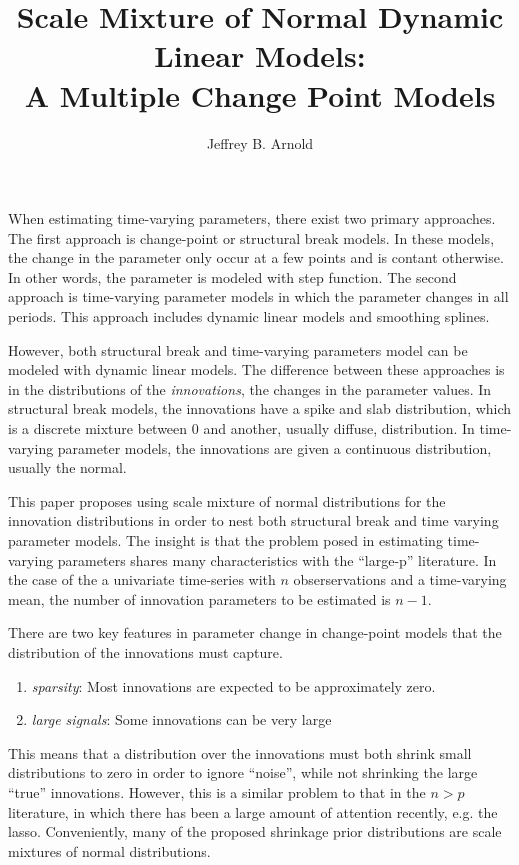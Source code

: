 \documentclass{article}
\author{Jeffrey B. Arnold}
\title{Scale Mixture of Normal Dynamic Linear Models:\\
  A Multiple Change Point Models}
\begin{document}
\maketitle{}

When estimating time-varying parameters, there exist two primary approaches.
The first approach is change-point or structural break models. 
In these models, the change in the parameter only occur at a few points and is contant otherwise.
In other words, the parameter is modeled with step function.
The second approach is time-varying parameter models in which the parameter changes in all periods.
This approach includes dynamic linear models and smoothing splines.

However, both structural break and time-varying parameters model can be modeled with dynamic linear models.
The difference between these approaches is in the distributions of the \textit{innovations}, the changes in the parameter values.
In structural break models, the innovations have a spike and slab distribution, which is a discrete mixture between 0 and another, usually diffuse, distribution.
In time-varying parameter models, the innovations are given a continuous distribution, usually the normal.

This paper proposes using scale mixture of normal distributions for the innovation distributions in order to nest both structural break and time varying parameter models.
The insight is that the problem posed in estimating time-varying parameters shares many characteristics with the ``large-p'' literature.
In the case of the a univariate time-series with $n$ obserservations and a time-varying mean, the number of innovation parameters to be estimated is $n - 1$.

There are two key features in parameter change in change-point models that the distribution of the innovations must capture.
\begin{enumerate}
\item \textit{sparsity}: Most innovations are expected to be approximately zero.
\item \textit{large signals}: Some innovations can be very large
\end{enumerate}
This means that a distribution over the innovations must both shrink small distributions to zero in order to ignore ``noise'', while not shrinking the large ``true'' innovations.
However, this is a similar problem to that in the $n > p$ literature, in which there has been a large amount of attention recently, e.g. the lasso.
Conveniently, many of the proposed shrinkage prior distributions are scale mixtures of normal distributions.
\end{document}
